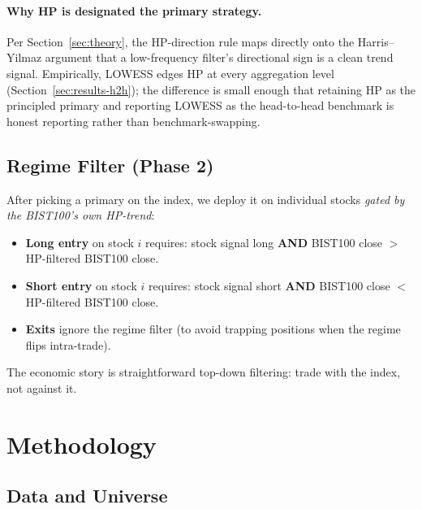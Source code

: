 \documentclass[11pt,a4paper]{article}
\begin{document}
\paragraph{Why HP is designated the primary strategy.}
Per Section~\ref{sec:theory}, the HP-direction rule maps directly onto the
Harris--Yilmaz argument that a low-frequency filter's directional sign is a
clean trend signal. Empirically, LOWESS edges HP at every aggregation level
(Section~\ref{sec:results-h2h}); the difference is small enough that retaining
HP as the principled primary and reporting LOWESS as the head-to-head
benchmark is honest reporting rather than benchmark-swapping.

\subsection{Regime Filter (Phase 2)}\label{sec:regime}

After picking a primary on the index, we deploy it on individual stocks
\emph{gated by the BIST100's own HP-trend}:
\begin{itemize}[leftmargin=1.5em,itemsep=2pt]
    \item \textbf{Long entry} on stock $i$ requires: stock signal long
          \textbf{AND} BIST100 close $>$ HP-filtered BIST100 close.
    \item \textbf{Short entry} on stock $i$ requires: stock signal short
          \textbf{AND} BIST100 close $<$ HP-filtered BIST100 close.
    \item \textbf{Exits} ignore the regime filter (to avoid trapping positions
          when the regime flips intra-trade).
\end{itemize}
The economic story is straightforward top-down filtering: trade with the
index, not against it.

\section{Methodology}

\subsection{Data and Universe}
\end{document}
